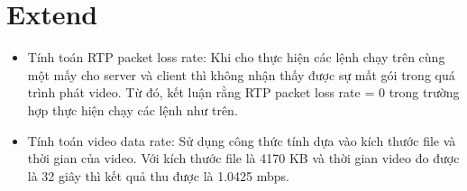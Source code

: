 \documentclass[12pt,a4paper]{article}
\begin{document}
\section{Extend}
\begin{itemize}
    \item Tính toán RTP packet loss rate: Khi cho thực hiện các lệnh chạy trên cùng một mấy cho server và client thì không nhận thấy được sự mất gói trong quá trình phát video. Từ đó, kết luận rằng RTP packet loss rate = 0 trong trường hợp thực hiện chạy các lệnh như trên.
    \item Tính toán video data rate: Sử dụng công thức tính dựa vào kích thước file và thời gian của video. Với kích thước file là 4170 KB và thời gian video đo được là 32 giây thì kết quả thu được là 1.0425 mbps.
\end{itemize}
\end{document}
